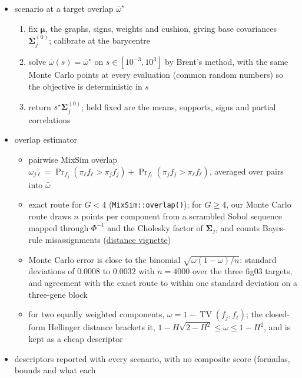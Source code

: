 \documentclass[pdflatex, sn-nature]{sn-jnl}
\theoremstyle{thmstyleone}%
\theoremstyle{thmstyletwo}%
\theoremstyle{thmstylethree}%
\newcommand{\vignette}[2]{\href{https://bastienchassagnol.github.io/DeCovarT/articles/#1}{#2}}
\begin{document}
\begin{itemize}
  \item scenario at a target overlap \(\bar\omega^{\star}\)
  \begin{enumerate}
    \item fix \(\boldsymbol{\mu}\), the graphs, signs, weights and cushion, giving base covariances
          \(\boldsymbol{\Sigma}^{(0)}_{j}\); calibrate at the barycentre
    \item solve \(\bar\omega(s)=\bar\omega^{\star}\) on \(s\in[10^{-3},10^{3}]\) by Brent's method, with the
          same Monte Carlo points at every evaluation (common random numbers) so the objective is
          deterministic in \(s\)
    \item return \(s^{\star}\boldsymbol{\Sigma}^{(0)}_{j}\); held fixed are the means, supports, signs and partial
          correlations
  \end{enumerate}
  \item overlap estimator
  \begin{itemize}
    \item pairwise MixSim overlap
          \(\omega_{j\ell}=\Pr_{f_{j}}(\pi_{\ell}f_{\ell}>\pi_{j}f_{j})+\Pr_{f_{\ell}}(\pi_{j}f_{j}>\pi_{\ell}f_{\ell})\),
          averaged over pairs into \(\bar\omega\) \cite{maitraSimulatingDataStudy2010,melnykovMixSimPackageSimulating2012}
    \item exact route for \(G<4\) (\texttt{MixSim::overlap()}); for \(G\ge4\), our Monte Carlo route draws
          \(n\) points per component from a scrambled Sobol sequence mapped through \(\Phi^{-1}\) and the
          Cholesky factor of \(\boldsymbol{\Sigma}_{j}\), and counts Bayes-rule misassignments
          (\vignette{04-2-distances-overlap-metrics.html}{distance vignette})
    \item Monte Carlo error is close to the binomial \(\sqrt{\omega(1-\omega)/n}\): standard deviations of
          \(0.0008\) to \(0.0032\) with \(n=4000\) over the three fig03 targets, and agreement with the
          exact route to within one standard deviation on a three-gene block
    \item for two equally weighted components, \(\omega=1-\operatorname{TV}(f_{j},f_{\ell})\); the closed-form
          Hellinger distance brackets it, \(1-H\sqrt{2-H^{2}}\le\omega\le1-H^{2}\), and is kept as a cheap descriptor
  \end{itemize}
  \item descriptors reported with every scenario, with no composite score (formulas, bounds and what each

\end{itemize}
\end{document}
